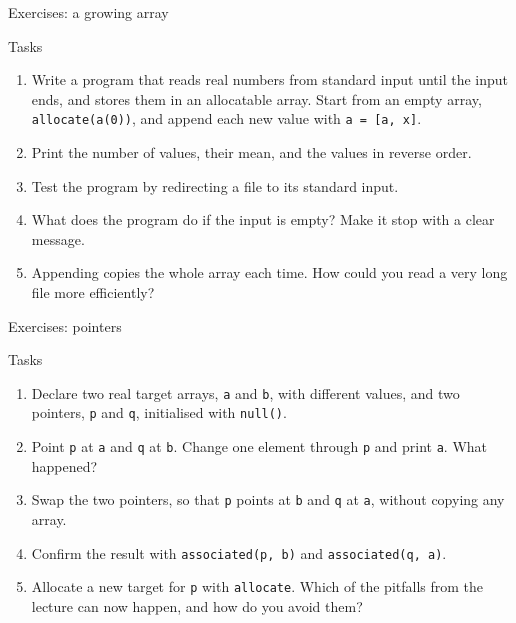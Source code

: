 \begin{frame}{Exercises: a growing array}
  \begin{block}{Tasks}
    \begin{enumerate}
      \item Write a program that reads real numbers from standard input until the input ends, and stores them in an allocatable array. Start from an empty array, \texttt{allocate(a(0))}, and append each new value with \texttt{a = [a, x]}.
      \item Print the number of values, their mean, and the values in reverse order.
      \item Test the program by redirecting a file to its standard input.
      \item What does the program do if the input is empty? Make it stop with a clear message.
      \item Appending copies the whole array each time. How could you read a very long file more efficiently?
    \end{enumerate}
  \end{block}
\end{frame}


\begin{frame}{Exercises: pointers}
  \begin{block}{Tasks}
    \begin{enumerate}
      \item Declare two real target arrays, \texttt{a} and \texttt{b}, with different values, and two pointers, \texttt{p} and \texttt{q}, initialised with \texttt{null()}.
      \item Point \texttt{p} at \texttt{a} and \texttt{q} at \texttt{b}. Change one element through \texttt{p} and print \texttt{a}. What happened?
      \item Swap the two pointers, so that \texttt{p} points at \texttt{b} and \texttt{q} at \texttt{a}, without copying any array.
      \item Confirm the result with \texttt{associated(p, b)} and \texttt{associated(q, a)}.
      \item Allocate a new target for \texttt{p} with \texttt{allocate}. Which of the pitfalls from the lecture can now happen, and how do you avoid them?
    \end{enumerate}
  \end{block}
\end{frame}


